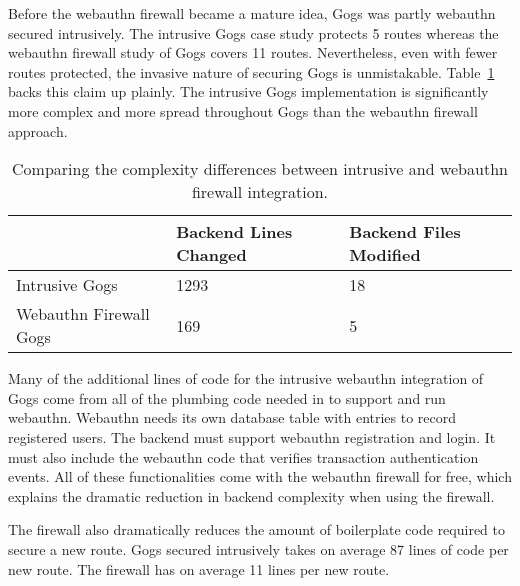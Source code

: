 Before the webauthn firewall became a mature idea, Gogs was partly webauthn secured intrusively. The intrusive Gogs case study protects 5 routes whereas the webauthn firewall study of Gogs covers 11 routes. Nevertheless, even with fewer routes protected, the invasive nature of securing Gogs is unmistakable. Table~\ref{Table:EvaluationsComplexityDiffIntrusiveFirewall} backs this claim up plainly. The intrusive Gogs implementation is significantly more complex and more spread throughout Gogs than the webauthn firewall approach.

\begin{table}[h]
\centering

\begin{tabular}{ m{5cm} m{4.5cm} m{4.5cm}  } 
 \hline
 & Backend Lines Changed & Backend Files Modified \\ 
 \hline \hline

 Intrusive Gogs & 1293 & 18 \\ \hline

 Webauthn Firewall Gogs & 169 & 5 \\ \hline


\end{tabular}
\caption{Comparing the complexity differences between intrusive and webauthn firewall integration.}
\label{Table:EvaluationsComplexityDiffIntrusiveFirewall}
\end{table}

Many of the additional lines of code for the intrusive webauthn integration of Gogs come from all of the plumbing code needed in to support and run webauthn. Webauthn needs its own database table with entries to record registered users. The backend must support webauthn registration and login. It must also include the webauthn code that verifies transaction authentication events. All of these functionalities come with the webauthn firewall for free, which explains the dramatic reduction in backend complexity when using the firewall.

The firewall also dramatically reduces the amount of boilerplate code required to secure a new route. Gogs secured intrusively takes on average 87 lines of code per new route. The firewall has on average 11 lines per new route.



